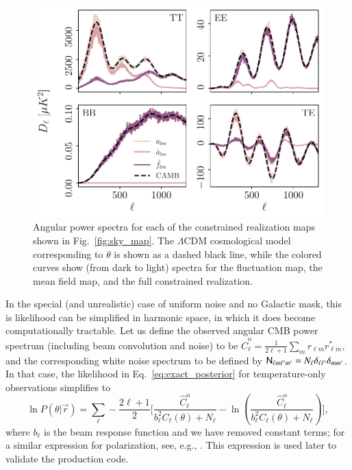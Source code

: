 \documentclass[twocolumn]{../common/aa}
\newcommand{\N}[0]{\tens{N}}
\renewcommand{\r}[0]{\vec{r}}
\begin{document}
\begin{figure}
	\centering
	\includegraphics[width=\linewidth]{figures/sigma_ell.pdf}
	\caption{\label{fig:sigma_ell}Angular power spectra for each of the constrained realization maps shown in Fig.~\ref{fig:sky_map}. The $\Lambda$CDM cosmological model corresponding to $\theta$ is shown as a dashed black line, while the colored curves show (from dark to light) spectra for the fluctuation map, the mean field map, and the full constrained realization.}
\end{figure}

In the special (and unrealistic) case of uniform noise and no Galactic mask, this is likelihood can be simplified in harmonic space, in which it does become computationally tractable. Let us define the observed angular CMB power spectrum (including beam convolution and noise) to be $\hat{C}^{\mathrm{o}}_{\ell} = \frac{1}{2\ell+1}\sum_m r_{\ell m}r^*_{\ell m}$, and the corresponding white noise spectrum to be defined by $\N_{\ell m \ell'm'} = N_\ell \delta_{\ell \ell'}\delta_{mm'}$. In that case, the likelihood in Eq.~\eqref{eq:exact_posterior} for temperature-only observations simplifies to
{\small
\begin{equation}
  \ln P(\theta | \r) = \sum_{\ell} -\frac{2\ell+1}{2} \bigg[\frac{\hat{C}^{\mathrm{o}}_{\ell}}{b_\ell^2 C_{\ell}(\theta) + N_\ell}-\ln \left(\frac{\hat{C}^{\mathrm{o}}_{\ell}}{b_\ell^2 C_{\ell}(\theta) + N_\ell} \right) \bigg],
  \label{eq:exact_harm}
\end{equation}}
where $b_\ell$ is the beam response function and we have removed constant terms; for a similar expression for polarization, see, e.g., \citet{larson:2006,Hamimeche:2008ai}. This expression is used later to validate the production code.
\end{document}
